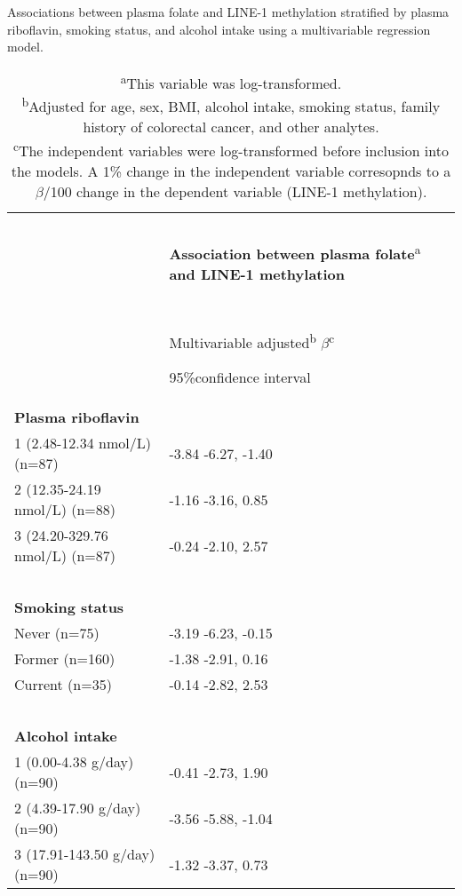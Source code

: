 \begin{table}
\caption{Associations between plasma folate and LINE-1 methylation stratified by plasma riboflavin, smoking status, and alcohol intake using a multivariable regression model.}
\label{table5_5}
\begin{adjustbox}{width=\textwidth}
\begin{tabular}{L{5.5cm}C{6.5cm}}

\hline
~ & ~\\
 ~ & %
\textbf{Association between plasma folate}\textsuperscript{a}
\textbf{and LINE-1 methylation}\\
~ & ~\\
~ & { Multivariable adjusted\textsuperscript{b}}{ $\beta $\textsuperscript{c}}

 95\%confidence interval\\
\hline
\textbf{Plasma riboflavin} & ~ \\
1 (2.48-12.34 nmol/L) (n=87) & { {}-3.84} {}-6.27, -1.40\\
2 (12.35-24.19 nmol/L) (n=88) & { {}-1.16} {}-3.16, 0.85\\
3 (24.20-329.76 nmol/L) (n=87) & { {}-0.24} {}-2.10, 2.57\\
~ & ~ \\
\textbf{Smoking status} & ~ \\
Never (n=75) & { {}-3.19} {}-6.23, -0.15\\
Former (n=160) & { {}-1.38} {}-2.91, 0.16\\
Current (n=35) & { {}-0.14} {}-2.82, 2.53\\
~ & ~ \\
\textbf{Alcohol intake} & ~ \\
1 (0.00-4.38 g/day) (n=90) & { {}-0.41} {}-2.73, 1.90\\
2 (4.39-17.90 g/day) (n=90) & { {}-3.56} {}-5.88, -1.04\\
3 (17.91-143.50 g/day) (n=90) & { {}-1.32} {}-3.37, 0.73\\
\hline
\end{tabular}
\end{adjustbox}
\caption*{\footnotesize{\textsuperscript{a}This variable was log-transformed.\\\textsuperscript{b}Adjusted for age, sex, BMI, alcohol intake, smoking status, family history of colorectal cancer, and other analytes.\\\textsuperscript{c}The independent variables were log-transformed before inclusion into the models. A 1\% change in the independent variable corresopnds to a $\beta$/100 change in the dependent variable (LINE-1 methylation).}}
\end{table}


